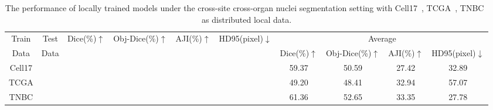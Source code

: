 \documentclass[letterpaper]{article} %
\begin{document}
\begin{table}
\centering
\scalebox{0.9}
{
\begin{tabular}{cccccc|cccc}
\toprule
Train
&Test   &\multirow{2}{*}{Dice(\%)$\uparrow$} &\multirow{2}{*}{Obj-Dice(\%)$\uparrow$} &\multirow{2}{*}{{AJI(\%)$\uparrow$}} &\multirow{2}{*}{HD95(pixel)$\downarrow$} &\multicolumn{4}{c}{Average}\\
Data &Data & & & &  &Dice(\%)$\uparrow$ &{Obj-Dice(\%)$\uparrow$} &{AJI(\%)$\uparrow$} &HD95(pixel)$\downarrow$\\
\midrule
\multirow{3}{*}{Cell17}  &\cellcolor{gray0}{Cell17} &\cellcolor{gray0}{85.90} &\cellcolor{gray0}{67.24} &\cellcolor{gray0}{44.26} &\cellcolor{gray0}{8.21} &\multirow{3}{*}{59.37}  &\multirow{3}{*}{50.59} &\multirow{3}{*}{27.42}  &\multirow{3}{*}{32.89}\\  
&\cellcolor{gray1}{TCGA} &\cellcolor{gray1}{43.03} &\cellcolor{gray1}{33.83} &\cellcolor{gray1}{11.75} &\cellcolor{gray1}{34.75} & & &  \\
&\cellcolor{gray2}{TNBC} &\cellcolor{gray2}{49.18} &\cellcolor{gray2}{50.70} &\cellcolor{gray2}{26.26} &\cellcolor{gray2}{55.71} & & &  \\ \midrule
\multirow{3}{*}{TCGA}   &\cellcolor{gray0}{Cell17} &\cellcolor{gray0}{55.10} &\cellcolor{gray0}{48.25} &\cellcolor{gray0}{29.42} &\cellcolor{gray0}{31.94} &\multirow{3}{*}{49.20}  &\multirow{3}{*}{48.41} &\multirow{3}{*}{32.94} &\multirow{3}{*}{57.07}  \\ 
&\cellcolor{gray1}{TCGA} &\cellcolor{gray1}{75.75} &\cellcolor{gray1}{71.58} &\cellcolor{gray1}{51.91} &\cellcolor{gray1}{13.14} & & &  \\
&\cellcolor{gray2}{TNBC}  &\cellcolor{gray2}{16.77} &\cellcolor{gray2}{25.42} &\cellcolor{gray2}{7.50} &\cellcolor{gray2}{126.14} & & &  \\ \midrule
\multirow{3}{*}{TNBC} &\cellcolor{gray0}{Cell17} &\cellcolor{gray0}{70.42} &\cellcolor{gray0}{56.79} &\cellcolor{gray0}{36.59} &\cellcolor{gray0}{24.33} &\multirow{3}{*}{61.36}  &\multirow{3}{*}{52.65} &\multirow{3}{*}{33.35} &\multirow{3}{*}{27.78} \\
&\cellcolor{gray1}{TCGA} &\cellcolor{gray1}{35.59} &\cellcolor{gray1}{24.32} &\cellcolor{gray1}{5.65} &\cellcolor{gray1}{35.31} & & &  \\
&\cellcolor{gray2}{TNBC} &\cellcolor{gray2}{78.08} &\cellcolor{gray2}{76.84} &\cellcolor{gray2}{57.81} &\cellcolor{gray2}{23.72} & & &  \\ 
\bottomrule
\end{tabular}}
\caption{The performance of locally trained models under the cross-site cross-organ nuclei segmentation setting with Cell17~\cite{vu2019methods}, TCGA~\cite{kumar2017dataset}, TNBC~\cite{naylor2018segmentation} as distributed local data. 
} 
\label{tab:nucleis2}
\end{table}
\end{document}
